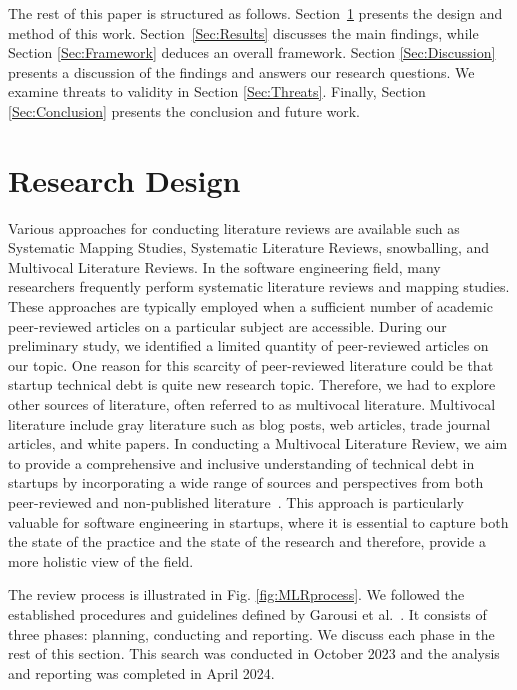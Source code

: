 The rest of this paper is structured as follows.
Section~\ref{Sec:Research} presents the design and method of this work.
Section~\ref{Sec:Results} discusses the main findings, while Section \ref{Sec:Framework} deduces an overall framework. Section \ref{Sec:Discussion} presents a discussion of the findings and answers our research questions.
We examine threats to validity in Section \ref{Sec:Threats}.
Finally, Section \ref{Sec:Conclusion} presents the conclusion and future work.

\section{Research Design}\label{Sec:Research}
Various approaches for conducting literature reviews are available such as Systematic Mapping Studies, Systematic Literature Reviews, snowballing, and Multivocal Literature Reviews.
In the software engineering field, many researchers frequently perform systematic literature reviews and mapping studies.
These approaches are typically employed when a sufficient number of academic peer-reviewed articles on a particular subject are accessible.
During our preliminary study, we identified a limited quantity of peer-reviewed articles on our topic.
One reason for this scarcity of peer-reviewed literature could be that startup technical debt is quite new research topic.
Therefore, we had to explore other sources of literature, often referred to as multivocal literature.
Multivocal literature include gray literature such as blog posts, web articles, trade journal articles, and white papers.
In conducting a Multivocal Literature Review, we aim to provide a comprehensive and inclusive understanding of technical debt in startups by incorporating a wide range of sources and perspectives from both peer-reviewed and non-published literature~\cite{Ogawa91, Garousi2016/2915970.2916008}.
This approach is particularly valuable for software engineering in startups, where it is essential to capture both the state of the practice and the state of the research and therefore, provide a more holistic view of the field. 

The review process is illustrated in Fig. \ref{fig:MLRprocess}.
We followed the established procedures and guidelines defined by Garousi et al.~\cite{GAROUSI2019101}.
It consists of three phases: planning, conducting and reporting.
We discuss each phase in the rest of this section.
This search was conducted in October 2023 and the analysis and reporting was completed in April 2024.

